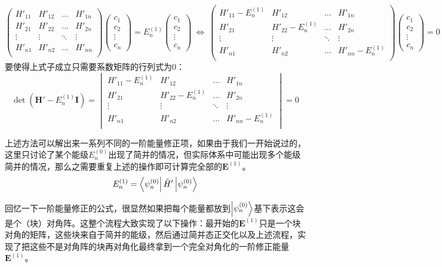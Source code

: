 \[\begin{pmatrix}
H'_{11} & H'_{12} & \ldots & H'_{1n}\\
H'_{21} & H'_{22} & \ldots & H'_{2n}\\
\vdots & \vdots & \ddots & \vdots\\
H'_{n1} & H'_{n2} & \ldots & H'_{nn}\\
\end{pmatrix}
\begin{pmatrix}c_1\\c_2\\\vdots\\c_n\end{pmatrix}
=E_n^{(1)}\begin{pmatrix}c_1\\c_2\\\vdots\\c_n\end{pmatrix}
\ \Leftrightarrow \
\begin{pmatrix}
H'_{11}-E_n^{(1)} & H'_{12} & \ldots & H'_{1n}\\
H'_{21} & H'_{22}-E_n^{(1)} & \ldots & H'_{2n}\\
\vdots & \vdots & \ddots & \vdots\\
H'_{n1} & H'_{n2} & \ldots & H'_{nn}-E_n^{(1)}\\
\end{pmatrix}
\begin{pmatrix}c_1\\c_2\\\vdots\\c_n\end{pmatrix}=0\]
要使得上式子成立只需要系数矩阵的行列式为0：
\[\det(\mathbf{H}'-E_n^{(1)}\mathbf{I})=\begin{vmatrix}
H'_{11}-E_n^{(1)} & H'_{12} & \ldots & H'_{1n}\\
H'_{21} & H'_{22}-E_n^{(1)} & \ldots & H'_{2n}\\
\vdots & \vdots & \ddots & \vdots\\
H'_{n1} & H'_{n2} & \ldots & H'_{nn}-E_n^{(1)}\\
\end{vmatrix}=0\]

上述方法可以解出来一系列不同的一阶能量修正项，如果由于我们一开始说过的，这里只讨论了某个能级$E_n^{(0)}$出现了简并的情况，但实际体系中可能出现多个能级简并的情况，那么之需要重复上述的操作即可计算完全部的$\mathbf{E}^{(1)}$。
\[E_n^{(1)}=\bra{\psi_n^{(0)}}\hat{H}'\ket{\psi_n^{(0)}}\]

回忆一下一阶能量修正的公式，很显然如果把每个能量都放到$\ket{\psi_{n}^{(0)}}$基下表示这会是个（块）对角阵。这整个流程大致实现了以下操作：最开始的$\mathbf{E}^{(1)}$只是一个块对角的矩阵，这些块来自于简并的能级，然后通过简并态正交化以及上述流程，实现了把这些不是对角阵的块再对角化最终拿到一个完全对角化的一阶修正能量$\mathbf{E}^{(1)}$。

